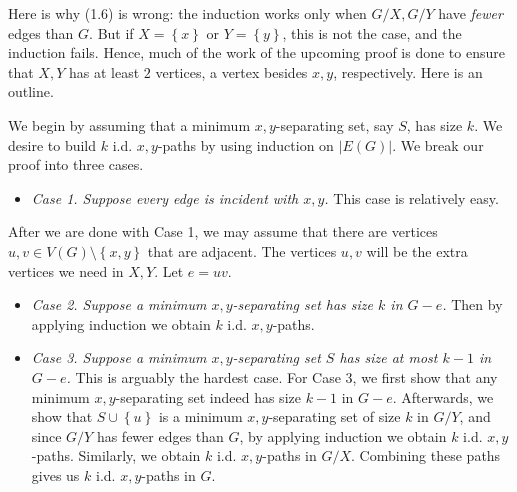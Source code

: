 \documentclass[co342]{subfiles}
\begin{document}
    Here is why (1.6) is wrong: the induction works only when $G /X, G /Y$ have \textit{fewer} edges than $G$. But if $X = \left\lbrace x \right\rbrace$ or $Y=\left\lbrace y \right\rbrace$, this is not the case, and the induction fails. Hence, much of the work of the upcoming proof is done to ensure that $X,Y$ has at least $2$ vertices, a vertex besides $x,y$, respectively. Here is an outline.

    \begin{subproof}
        We begin by assuming that a minimum $x,y$-separating set, say $S$, has size $k$. We desire to build $k$ i.d. $x,y$-paths by using induction on $\left| E\left( G \right)  \right|$. We break our proof into three cases.
        \begin{itemize}
            \item \textit{Case 1. Suppose every edge is incident with $x,y$.} This case is relatively easy.
        \end{itemize} 
        After we are done with Case 1, we may assume that there are vertices $u,v\in V\left( G \right) \setminus \left\lbrace x,y \right\rbrace$ that are adjacent. The vertices $u,v$ will be the extra vertices we need in $X,Y$. Let $e=uv$.
        \begin{itemize}
            \item \textit{Case 2. Suppose a minimum $x,y$-separating set has size $k$ in $G-e$.} Then by applying induction we obtain $k$ i.d. $x,y$-paths.
            \item \textit{Case 3. Suppose a minimum $x,y$-separating set $S$ has size at most $k-1$ in $G-e$.} This is arguably the hardest case. For Case 3, we first show that any minimum $x,y$-separating set indeed has size $k-1$ in $G-e$. Afterwards, we show that $S\cup \left\lbrace u \right\rbrace$ is a minimum $x,y$-separating set of size $k$ in $G /Y$, and since $G /Y$ has fewer edges than $G$, by applying induction we obtain $k$ i.d. $x,y$-paths. Similarly, we obtain $k$ i.d. $x,y$-paths in $G /X$. Combining these paths gives us $k$ i.d. $x,y$-paths in $G$. \qqqedsym
        \end{itemize} 
    \end{subproof}
\end{document}
